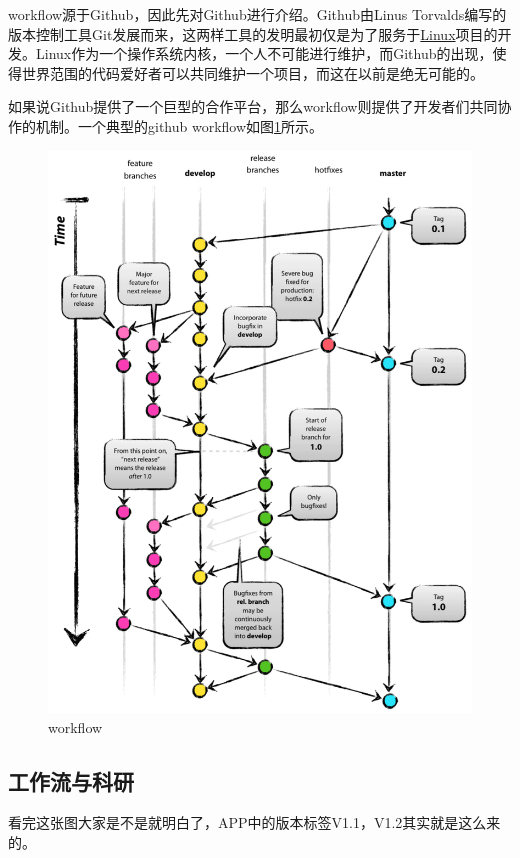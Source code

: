 \documentclass[UTF8]{ctexbook}
\begin{document}
workflow源于Github，因此先对Github进行介绍。Github由Linus Torvalds编写的版本控制工具Git发展而来，这两样工具的发明最初仅是为了服务于\href{https://github.com/torvalds/linux}{Linux}项目的开发。Linux作为一个操作系统内核，一个人不可能进行维护，而Github的出现，使得世界范围的代码爱好者可以共同维护一个项目，而这在以前是绝无可能的。

如果说Github提供了一个巨型的合作平台，那么workflow则提供了开发者们共同协作的机制。一个典型的github workflow如图\ref{fig:workflow}所示。

\begin{figure}[!htb]
	\centering
	\includegraphics[width=1\linewidth]{Figure/workflow.pdf}
	\vspace{-0.3cm}
	\caption{workflow}\label{fig:workflow}
\end{figure}

\subsection{工作流与科研}
看完这张图大家是不是就明白了，APP中的版本标签V1.1，V1.2其实就是这么来的。
\end{document}
